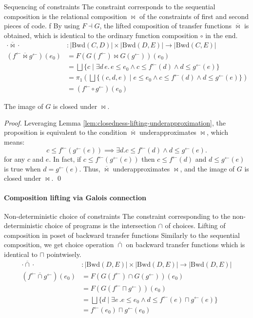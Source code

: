 \documentclass{llncs}
\newcommand{\Unidir}{\mathrm{Bwd}}
\newcommand{\fb}{{f^{\leftarrow}}}
\newcommand{\gb}{{g^{\leftarrow}}}
\newcommand{\bigjoin}{\bigsqcup}
\newcommand{\meet}{\sqcap}
\newcommand{\comp}{\circ}
\newcommand{\bowtielift}{\mathbin{\overline{\bowtie}}}
\newcommand{\caplift}{\mathbin{\overline{\cap}}}
\begin{document}
  Sequencing of constraints
    The constraint corresponds to the sequential composition is the relational composition $\bowtie$ of the constraints of first and second pieces of code.
f
    By using $F \dashv G$, the lifted composition of transfer functions $\bowtielift$ is obtained, which is identical to the ordinary function composition $\comp$ in the end.
    \begin{align*}
      \cdot \bowtielift \cdot &: \left| \Unidir(C, D) \right| \times  \left| \Unidir(D, E) \right| \to  \left| \Unidir(C, E) \right| \\
      (\fb \bowtielift \gb) (e_{0}) &= F(G(\fb) \bowtie G(\gb)) (e_{0}) \\
                                  &= \bigjoin \{ c \mid \exists d\, e.\,e \leq e_{0} \land c \leq \fb(d) \land d \leq \gb(e) \} \\
                                  &= \pi_{1} (\bigjoin \{ (c, d , e) \mid e \leq e_{0} \land c \leq \fb(d) \land d \leq \gb(e) \}) \\
                                  &= (\fb \comp \gb)(e_{0})
    \end{align*}
    \begin{proposition}\label{prop:backword-closed-under-composition}
      The image of $G$ is closed under $\bowtie$.
      \begin{proof}
        Leveraging Lemma \ref{lem:closedness-lifting-underapproximation}, the proposition is equivalent to the condition $\bowtielift$ underapproximates $\bowtie$, which means:
        \[
          c \leq \fb (\gb (e)) \implies \exists d. c \leq \fb(d) \land d \leq \gb(e).
        \] for any $c$ and $e$.
        In fact, if $c \leq \fb (\gb (e))$ then $c \leq \fb(d)$ and $d \leq \gb(e)$ is true when $d = \gb(e)$. Thus, $\bowtielift$ underapproximates $\bowtie$, and the image of $G$ is closed under $\bowtie$. \qed
      \end{proof}
    \end{proposition}
  \paragraph{Composition lifting via Galois connection}

  Non-deterministic choice of constraints
    The constraint corresponding to the non-deterministic choice of programs is the intersection $\cap$ of choices.
 Lifting of composition in poset of backward transfer functions
    Similarly to the sequential composition, we get choice operation $\caplift$ on backward transfer functions which is identical to $\meet$ pointwisely.
    \begin{align*}
      \cdot \caplift \cdot &: \left| \Unidir(D , E) \right| \times  \left| \Unidir(D, E) \right| \to \left| \Unidir(D, E) \right| \\
      (\fb \caplift \gb) (e_{0})
      &= F(G(\fb) \cap G(\gb)) (e_{0}) \\
      &= F(G(\fb \meet \gb)) (e_{0}) \\
      &= \bigjoin \{ d \mid \exists e\,. e \leq e_{0} \land d \leq \fb(e) \meet \gb(e) \} \\
      &= \fb(e_{0}) \meet \gb(e_{0})
    \end{align*}
\end{document}
